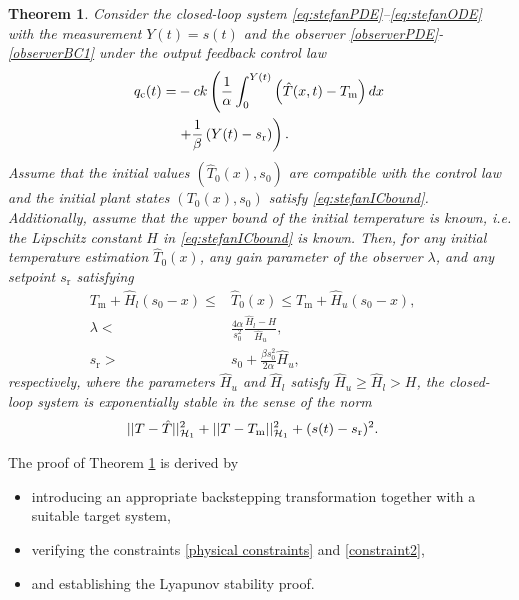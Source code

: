 \documentclass[journal]{IEEEtran}
\newtheorem{thm}{Theorem}
\begin{document}
\begin{thm}\label{outputthm}
Consider the closed-loop system  \eqref{eq:stefanPDE}--\eqref{eq:stefanODE} with the measurement $Y(t)=s(t)$ and the observer \eqref{observerPDE}-\eqref{observerBC1} under the output feedback control law
\begin{align}\label{outctr}
q_{{\mathrm c}}(t)=&-ck\left(\frac{1}{\alpha} \int_{0}^{Y(t)} \left(\hat{T}(x,t)-T_{{\mathrm m}}\right) dx\right.\notag\\
&\left.+\frac{1 }{\beta} \left(Y(t)-s_{{\mathrm r}}\right) \right). 
\end{align}
Assume that the initial values $\left(\hat{T}_{0}(x), s_0\right)$ are compatible with the control law and the initial plant states $(T_{0}(x), s_0)$ satisfy \eqref{eq:stefanICbound}. Additionally, assume that the upper bound of the initial temperature is known, i.e. the Lipschitz constant $H$ in \eqref{eq:stefanICbound} is known. Then, for any initial temperature estimation $\hat{T}_0(x)$, any gain parameter of the observer $\lambda$, and  any setpoint $s_{{\mathrm r}}$ satisfying \begin{align}\label{restriction1}
T_{{\mathrm m}} +  \hat{H}_{l}(s_0 - x) \leq& \hat{T}_0(x) \leq T_{{\mathrm m}} +  \hat{H}_{u}(s_0 - x), \quad \\
\label{restriction2} \lambda <& \frac{4\alpha}{s_0^2}  \frac{\hat{H}_{l}-H}{\hat{H}_{u}}, \\
\label{restriction3} s_{{\mathrm r}}>&s_0+\frac{\beta s_0^2}{2\alpha } \hat{H}_{u}, 
\end{align}
respectively,  where the parameters $\hat{H}_{u}$ and $\hat{H}_{l}$ satisfy $\label{Hcond}\hat{H}_{u}\geq \hat{H}_{l}>H$, the closed-loop system is exponentially stable in the sense of the norm 
\begin{align}\label{h1output}
&||T-\hat{T}||_{{\cal H}_1}^2+||T-T_{{\mathrm m}}||_{{\cal H}_1}^2+(s(t)-s_{{\mathrm r}})^2 .
\end{align}
\end{thm}
The proof of Theorem \ref{outputthm} is  derived by
\begin{itemize}\item  introducing an appropriate backstepping transformation together with a suitable target system, \item verifying the constraints \eqref{physical constraints} and \eqref{constraint2},
\item and establishing the  Lyapunov stability proof.
\end{itemize}
\end{document}
